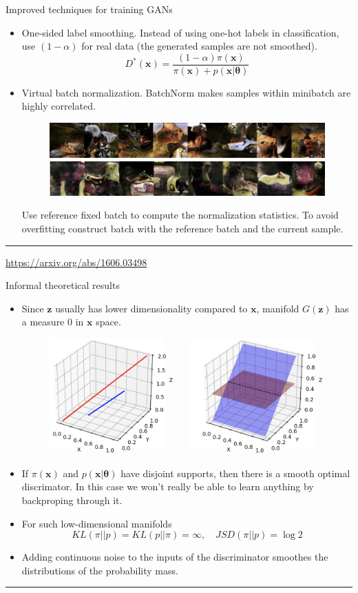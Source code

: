 \documentclass{beamer}
\newcommand{\bx}{\mathbf{x}}
\newcommand{\bz}{\mathbf{z}}
\newcommand{\btheta}{\boldsymbol{\theta}}
\begin{document}
\begin{frame}{Improved techniques for training GANs}
	\begin{itemize}
		\item One-sided label smoothing. Instead of using one-hot labels in classification, use $(1 - \alpha)$ for real data (the generated samples are not smoothed).
		\[
			D^*(\bx) = \frac{(1 - \alpha )\pi(\bx)}{\pi(\bx) + p(\bx | \btheta)}
		\]
		\item Virtual batch normalization. BatchNorm makes samples within minibatch are highly correlated.
		\begin{figure}
			\centering
			\includegraphics[width=0.6\linewidth]{figs/virtual_batch_norm}
		\end{figure}
	Use reference fixed batch to compute the normalization statistics. To avoid overfitting construct batch with the reference batch and the current sample. 
	\end{itemize}
	\vfill
	\hrule\medskip
	{\scriptsize \href{https://arxiv.org/abs/1606.03498}{https://arxiv.org/abs/1606.03498}}
\end{frame}
\begin{frame}{Informal theoretical results}
	\begin{itemize}
		\item Since $\bz$ usually has lower dimensionality compared to $\bx$, manifold $G(\bz)$ has a measure 0 in $\bx$ space.
		\begin{figure}
			\centering
			\includegraphics[width=0.5\linewidth]{figs/low_dim_manifold}
		\end{figure}
		\item If $\pi(\bx)$ and $p(\bx | \btheta)$ have disjoint supports, then there is a smooth optimal discrimator. In this case we won’t really be able to learn anything by backproping through it.
		\item For such low-dimensional manifolds
		\[
			KL(\pi || p) = KL(p || \pi) = \infty, \quad JSD(\pi || p) = \log 2
		\]
		\item Adding continuous noise to the inputs of the discriminator smoothes the distributions of the probability mass.
	\end{itemize}
	\vfill
	\hrule{}
\end{frame}
\end{document}
